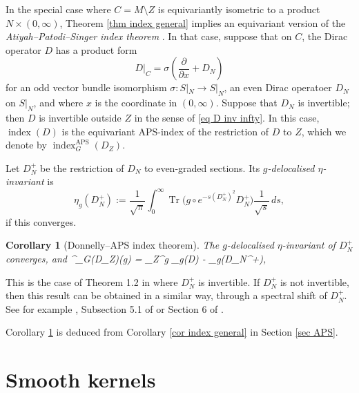 \documentclass[11pt]{article}
\theoremstyle{plain}
\newtheorem{corollary}[theorem]{Corollary}
\theoremstyle{definition}
\newtheorem{remark}[theorem]{Remark}
\theoremstyle{remark}
\numberwithin{equation}{section}
\DeclareMathOperator{\Tr}{Tr}
\DeclareMathOperator{\AS}{AS}
\DeclareMathOperator{\APS}{APS}
\DeclareMathOperator{\ind}{index}
\begin{document}



In the special case where $C ={M \setminus Z}$ is equivariantly isometric to a product $N \times (0, \infty)$, Theorem \ref{thm index general} implies an equivariant version of the \emph{Atiyah--Patodi--Singer index theorem} \cite{APS1, Donnelly}. In that case, suppose that on $C$, the Dirac operator $D$ has a product form
\[
D|_C = \sigma \left( \frac{\partial}{\partial x}+D_N\right)
\]
for an odd vector bundle isomorphism $\sigma\colon S|_N \to S|_N$, an even Dirac operatoer $D_N$ on $S|_N$, and where $x$ is the coordinate in $(0, \infty)$. Suppose that $D_N$ is invertible; then $D$ is invertible outside $Z$ in the sense of \eqref{eq D inv infty}.
In this case, $\ind(D)$ is the equivariant APS-index of the restriction of $D$ to $Z$, which we denote by $\ind^{\APS}_G(D_Z)$.

Let $D_N^+$ be the restriction of $D_N$ to even-graded sections.
Its  \emph{$g$-delocalised $\eta$-invariant}  is
\[
\eta_g(D_N^+) := \frac{1}{\sqrt{\pi}} \int_0^{\infty} \Tr\bigl(g \circ e^{-s (D_N^+)^2}D_N^+ \bigr)\frac{1}{\sqrt{s}}\, ds,
\]
if this converges.
\begin{corollary}[Donnelly--APS index theorem]\label{cor APS}
The $g$-delocalised $\eta$-invariant of $D_N^+$ converges, and
\ind^{\APS}_G(D_Z)(g) = \int_{Z^g} \AS_g(D) - \eta_g(D_N^+),
\eeq
\end{corollary}
This is the case of Theorem 1.2 in \cite{Donnelly} where $D_N^+$ is invertible.
If $D_N^+$ is not invertible, then this result can be obtained in a similar way,  through a spectral shift of $D_N^+$. See for example  \cite{Melrose}, Subsection 5.1 of \cite{HW21b} or Section 6 of \cite{HWW}.

Corollary \ref{cor APS} is deduced from Corollary \ref{cor index general} in Section \ref{sec APS}.

\section{Smooth kernels}\label{sec smooth kernels}
\end{document}
